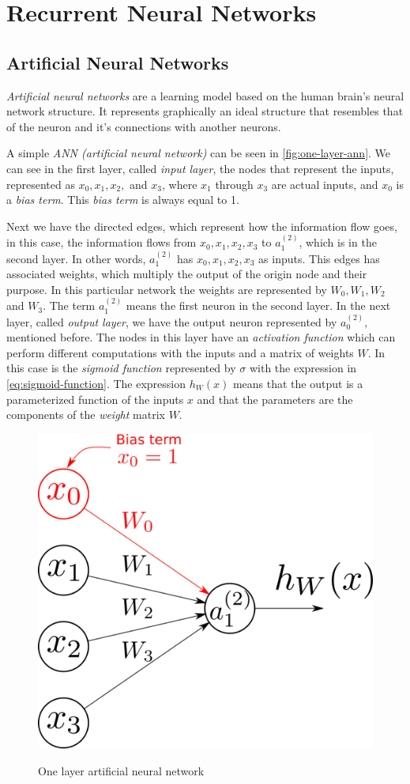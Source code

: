\chapter{Recurrent Neural Networks}
\label{ch:recurrent-neural-networks}

\section{Artificial Neural Networks}

\textit{Artificial neural networks} are a learning model based on the
human brain's neural network structure. It represents graphically an
ideal structure that resembles that of the neuron and it's connections
with another neurons.

A simple \textit{ANN (artificial neural network)} can be seen in
\autoref{fig:one-layer-ann}. We can see in the first layer, called
\textit{input layer}, the nodes that represent the inputs, represented
as $x_0, x_1, x_2,$ and $x_3$, where $x_1$ through $x_3$ are actual
inputs, and $x_0$ is a \textit{bias term}. This \textit{bias term} is
always equal to 1.

Next we have the directed edges, which represent how the information
flow goes, in this case, the information flows from $x_0, x_1, x_2,
x_3$ to $a_1^{(2)}$, which is in the second layer. In other words,
$a_1^{(2)}$ has $x_0, x_1, x_2, x_3$ as inputs. This edges has
associated weights, which multiply the output of the origin node and
their purpose. In this particular network the weights are represented
by $W_0, W_1, W_2$ and $W_3$. The term $a_1^{(2)}$ means the first
neuron in the second layer. In the next layer, called \textit{output
layer}, we have the output neuron represented by $a_0^{(2)},$
mentioned before. The nodes in this layer have an \textit{activation
function} which can perform different computations with the inputs and
a matrix of weights $W$. In this case is the \textit{sigmoid function}
represented by $\sigma$ with the expression in
\autoref{eq:sigmoid-function}. The expression $h_W(x)$ means that the
output is a parameterized function of the inputs $x$ and that the
parameters are the components of the \textit{weight} matrix $W$.

\begin{figure}[bth]
  \myfloatalign
  {\includegraphics[width=.6\linewidth]
    {gfx/simple-ann-model}}
  \caption{One layer artificial neural network}
  \label{fig:one-layer-ann}
\end{figure}


